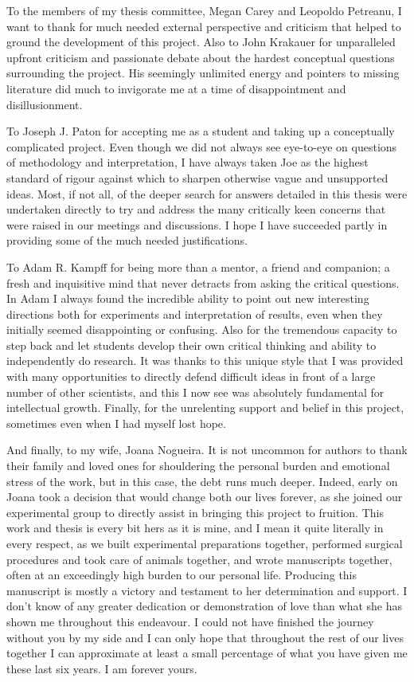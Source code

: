 To the members of my thesis committee, Megan Carey and Leopoldo Petreanu, I want to thank for much needed external perspective and criticism that helped to ground the development of this project. Also to John Krakauer for unparalleled upfront criticism and passionate debate about the hardest conceptual questions surrounding the project. His seemingly unlimited energy and pointers to missing literature did much to invigorate me at a time of disappointment and disillusionment.

To Joseph J. Paton for accepting me as a student and taking up a conceptually complicated project. Even though we did not always see eye-to-eye on questions of methodology and interpretation, I have always taken Joe as the highest standard of rigour against which to sharpen otherwise vague and unsupported ideas. Most, if not all, of the deeper search for answers detailed in this thesis were undertaken directly to try and address the many critically keen concerns that were raised in our meetings and discussions. I hope I have succeeded partly in providing some of the much needed justifications.

To Adam R. Kampff for being more than a mentor, a friend and companion; a fresh and inquisitive mind that never detracts from asking the critical questions. In Adam I always found the incredible ability to point out new interesting directions both for experiments and interpretation of results, even when they initially seemed disappointing or confusing. Also for the tremendous capacity to step back and let students develop their own critical thinking and ability to independently do research. It was thanks to this unique style that I was provided with many opportunities to directly defend difficult ideas in front of a large number of other scientists, and this I now see was absolutely fundamental for intellectual growth. Finally, for the unrelenting support and belief in this project, sometimes even when I had myself lost hope.

And finally, to my wife, Joana Nogueira. It is not uncommon for authors to thank their family and loved ones for shouldering the personal burden and emotional stress of the work, but in this case, the debt runs much deeper. Indeed, early on Joana took a decision that would change both our lives forever, as she joined our experimental group to directly assist in bringing this project to fruition. This work and thesis is every bit hers as it is mine, and I mean it quite literally in every respect, as we built experimental preparations together, performed surgical procedures and took care of animals together, and wrote manuscripts together, often at an exceedingly high burden to our personal life. Producing this manuscript is mostly a victory and testament to her determination and support. I don't know of any greater dedication or demonstration of love than what she has shown me throughout this endeavour. I could not have finished the journey without you by my side and I can only hope that throughout the rest of our lives together I can approximate at least a small percentage of what you have given me these last six years. I am forever yours.
